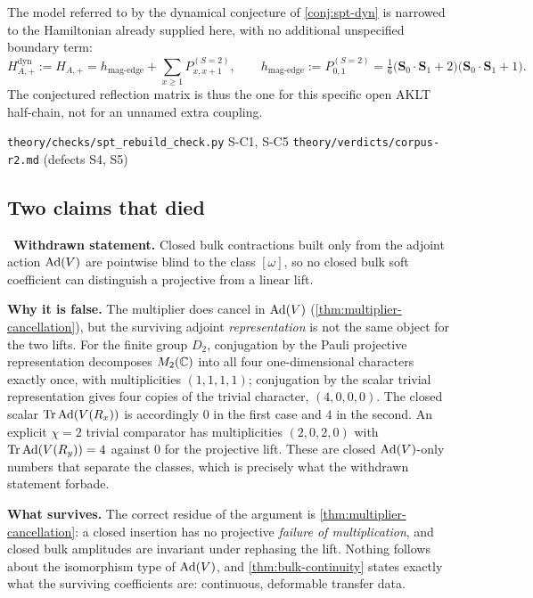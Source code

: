 \begin{definition}
The model referred to by the dynamical conjecture of \cref{conj:spt-dyn} is
narrowed to the Hamiltonian already supplied here, with no additional
unspecified boundary term:
\begin{equation}
  H_{A,+}^{\mathrm{dyn}}:=H_{A,+}
   = h_{\mathrm{mag\text{-}edge}}+\sum_{x\ge1}P^{(S=2)}_{x,x+1},
  \qquad
  h_{\mathrm{mag\text{-}edge}}:=P^{(S=2)}_{0,1}
   =\tfrac16\bigl(\mathbf S_0\!\cdot\!\mathbf S_1+2\bigr)
            \bigl(\mathbf S_0\!\cdot\!\mathbf S_1+1\bigr).
  \label{eq:spt-dyn-hamiltonian}
\end{equation}
The conjectured reflection matrix is thus the one for this specific open AKLT
half-chain, not for an unnamed extra coupling.
\end{definition}

%
{\texttt{theory/checks/spt\_rebuild\_check.py} S-C1, S-C5}%
{\texttt{theory/verdicts/corpus-r2.md} (defects S4, S5)}

\subsection{Two claims that died}

\begin{refutedclaim}\label{ref:bulk-blindness}
\statusRefuted\ \textbf{Withdrawn statement.} Closed bulk contractions built
only from the adjoint action $\operatorname{Ad}(V)$ are pointwise blind to the class
$[\omega]$, so no closed bulk soft coefficient can distinguish a projective
from a linear lift.

\textbf{Why it is false.} The multiplier does cancel in $\operatorname{Ad}(V)$
(\cref{thm:multiplier-cancellation}), but the surviving adjoint
\emph{representation} is not the same object for the two lifts. For the finite
group $D_2$, conjugation by the Pauli projective representation decomposes
$M_2(\mathbb{C})$ into all four one-dimensional characters exactly once, with
multiplicities $(1,1,1,1)$; conjugation by the scalar trivial representation
gives four copies of the trivial character, $(4,0,0,0)$. The closed scalar
$\operatorname{Tr}\operatorname{Ad}(V(R_x))$ is accordingly $0$ in the first case and $4$ in the second.
An explicit $\chi=2$ trivial comparator has multiplicities $(2,0,2,0)$ with
$\operatorname{Tr}\operatorname{Ad}(V(R_y))=4$ against $0$ for the projective lift. These are closed
$\operatorname{Ad}(V)$-only numbers that separate the classes, which is precisely what the
withdrawn statement forbade.

\textbf{What survives.} The correct residue of the argument is
\cref{thm:multiplier-cancellation}: a closed insertion has no projective
\emph{failure of multiplication}, and closed bulk amplitudes are invariant
under rephasing the lift. Nothing follows about the isomorphism type of
$\operatorname{Ad}(V)$, and \cref{thm:bulk-continuity} states exactly what the surviving
coefficients are: continuous, deformable transfer data.
\end{refutedclaim}

